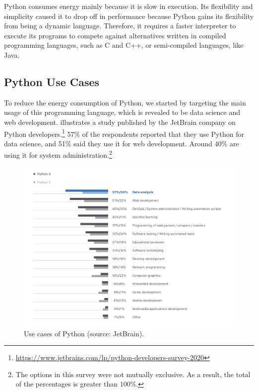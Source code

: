 Python consumes energy mainly because it is slow in execution.
Its flexibility and simplicity caused it to drop off in performance because Python gains its flexibility from being a dynamic language.
Therefore, it requires a faster interpreter to execute its programs to compete against alternatives written in compiled programming languages, such as C and C++, or semi-compiled languages, like Java.

\subsection{Python Use Cases}
To reduce the energy consumption of Python, we started by targeting the main usage of this programming language, which is revealed to be data science and web development.
 illustrates a study published by the JetBrain company on Python developers.\footnote{\url{https://www.jetbrains.com/lp/python-developers-survey-2020}}
57\% of the respondents reported that they use Python for data science, and 51\% said they use it for web development.
Around 40\% are using it for system administration.\footnote{The options in this survey were not mutually exclusive. As a result, the total of the percentages is greater than $100\%$.}

\begin{figure}[hbt]
    \centering
    \includegraphics[width=\linewidth]{imgs/python_use_cases}
    \caption{Use cases of Python (source: JetBrain).}
    \label{fig:usecase}
\end{figure}

